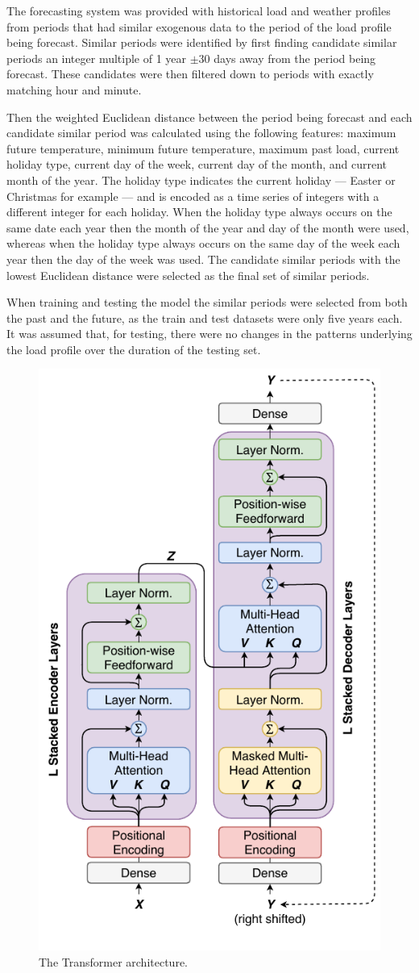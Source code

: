 \documentclass[conference]{IEEEtran}
\begin{document}
The forecasting system was provided with historical load and weather profiles from periods that had similar exogenous data to the period of the load profile being forecast.
Similar periods were identified by first finding candidate similar periods an integer multiple of 1 year $\pm$30 days away from the period being forecast.
These candidates were then filtered down to periods with exactly matching hour and minute.

Then the weighted Euclidean distance between the period being forecast and each candidate similar period was calculated using the following features: 
maximum future temperature, 
minimum future temperature,
maximum past load,
current holiday type, 
current day of the week,
current day of the month, and
current month of the year.
The holiday type indicates the current holiday --- Easter or Christmas for example --- and is encoded as a time series of integers with a different integer for each holiday.
When the holiday type always occurs on the same date each year then the month of the year and day of the month were used, whereas when the holiday type always occurs on the same day of the week each year then the day of the week was used.
The candidate similar periods with the lowest Euclidean distance were selected as the final set of similar periods.

When training and testing the model the similar periods were selected from both the past and the future, as the train and test datasets were only five years each.
It was assumed that, for testing, there were no changes in the patterns underlying the load profile over the duration of the testing set.

\begin{figure}[htbp]
	\centerline{\includegraphics[trim=0 0.8cm 0 0, width=.35\textwidth]{images/transformer.pdf}}
	\caption{The Transformer architecture.}
	\label{fig:transformer}
\end{figure}
\end{document}
